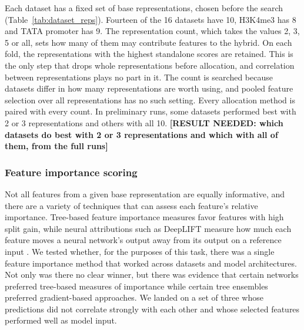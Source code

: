 Each dataset has a fixed set of base representations, chosen before the search (Table~\ref{tab:dataset_reps}). Fourteen of the 16 datasets have 10, H3K4me3 has 8 and TATA promoter has 9. The representation count, which takes the values 2, 3, 5 or all, sets how many of them may contribute features to the hybrid. On each fold, the representations with the highest standalone scores are retained. This is the only step that drops whole representations before allocation, and correlation between representations plays no part in it. The count is searched because datasets differ in how many representations are worth using, and pooled feature selection over all representations has no such setting. Every allocation method is paired with every count. In preliminary runs, some datasets performed best with 2 or 3 representations and others with all 10. \textbf{[RESULT NEEDED: which datasets do best with 2 or 3 representations and which with all of them, from the full runs]}

\subsubsection{Feature importance scoring}


Not all features from a given base representation are equally informative, and there are a variety of techniques that can assess each feature's relative importance. Tree-based feature importance measures favor features with high split gain, while neural attributions such as DeepLIFT measure how much each feature moves a neural network's output away from its output on a reference input \citep{Strobl2007, Ancona2018}.
We tested whether, for the purposes of this task, there was a single feature importance method that worked across datasets and model architectures. Not only was there no clear winner, but there was evidence that certain networks preferred tree-based measures of importance while certain tree ensembles preferred gradient-based approaches. We landed on a set of three whose predictions did not correlate strongly with each other and whose selected features performed well as model input.

